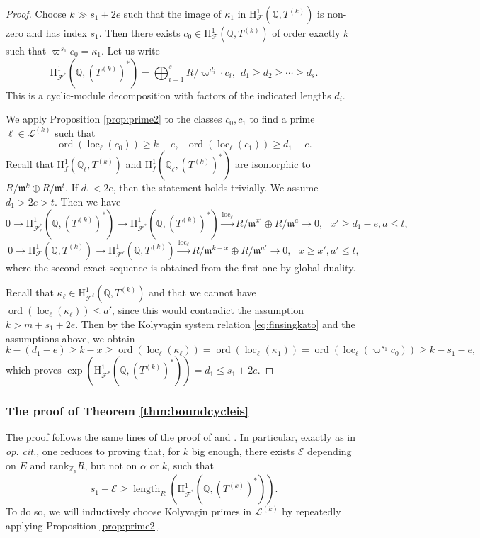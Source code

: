 \documentclass[10pt,reqno]{amsart}
\numberwithin{equation}{section}
\theoremstyle{plain}
\theoremstyle{definition}
\theoremstyle{definition}
\theoremstyle{plain}
\theoremstyle{plain}
\theoremstyle{plain}
\theoremstyle{plain}
\theoremstyle{plain}
\theoremstyle{plain}
\DeclareMathOperator{\ord}{ord}
\newcommand{\Q}{\mathbb{Q}}
\newcommand{\Zp}{\mathbb{Z}_{p}}
\DeclareMathOperator{\loc}{loc}
\DeclareMathOperator{\length}{length}
\newcommand{\Fcal}{\mathcal{F}}
\newcommand{\cL}{\mathcal{L}}
\newcommand{\fm}{\mathfrak{m}}
\newcommand{\rH}{\mathrm{H}}
\begin{document}
\begin{proof}
Choose $k\gg s_1+2e$ such that the image of $\kappa_1$ in $\rH^1_{\Fcal}(\Q,T^{(k)})$ is non-zero and has index $s_1$. Then there exists $c_0\in\rH^1_{\Fcal}(\Q,T^{(k)})$ of order exactly $k$ such that $\varpi^{s_1}c_0 = \kappa_1$. 
Let us write
\[
\rH^1_{\Fcal^*}(\Q,(T^{(k)})^*)=\bigoplus_{i=1}^{s} R/\varpi^{d_i}\cdot c_i, \ \ d_1\geq d_2 \geq \cdots \geq d_s.
\]
This is a cyclic-module decomposition with factors of the indicated lengths $d_i$. 

We apply Proposition \ref{prop:prime2} to the classes $c_0, c_1$ to find a prime $\ell \in \cL^{(k)}$ such that
\[
\ord(\loc_{\ell}(c_0))\geq k-e, \ \ \ \ord(\loc_{\ell}(c_1))\geq d_1-e.
\]
Recall that $\rH^1_f(\Q_{\ell},T^{(k)})$ and $\rH^1_f(\Q_{\ell}, (T^{(k)})^*)$ are isomorphic to $R/\fm^k\oplus R/\fm^t$. If $d_1<2e$, then the statement holds trivially. We assume $d_1>2e>t$. Then we have
\[
0\to \rH^1_{\Fcal^*_{\ell}}(\Q,(T^{(k)})^*) \to \rH^1_{\Fcal^*}(\Q,(T^{(k)})^*) \xrightarrow{\loc_\ell} R/\fm^{x'}\oplus R/\fm^a \to 0, \ \ \ x'\geq d_1-e, a\leq t,
\]
\[
0\to \rH^1_{\Fcal}(\Q,T^{(k)}) \to \rH^1_{\Fcal^{\ell}}(\Q,T^{(k)}) \xrightarrow{\loc_\ell} R/\fm^{k-x} \oplus R/\fm^{a'}\to 0, \ \ \ x\geq x', a'\leq t,
\]
where the second exact sequence is obtained from the first one by global duality. 

Recall that $\kappa_\ell \in \rH^1_{\Fcal^{\ell}}(\Q,T^{(k)})$ and that we cannot have $\ord(\loc_{\ell}(\kappa_\ell))\leq a'$, 
since this would contradict the assumption $k > m+s_1+2e$. Then by the Kolyvagin system relation \eqref{eq:finsingkato} and the assumptions above, we obtain
\[
k-(d_1 -e)\geq k-x\geq \ord(\loc_{\ell}(\kappa_\ell))=\ord(\loc_{\ell}(\kappa_1))=\ord(\loc_{\ell}(\varpi^{s_1}c_0))\geq k-s_1-e,
\]
which proves $\operatorname{exp}(\rH^1_{\Fcal^*}(\Q,(T^{(k)})^*))=d_1 \leq s_1+2e$. 
\end{proof}

\subsubsection{The proof of Theorem \ref{thm:boundcycleis}}
The proof follows the same lines of the proof of \cite[Thm. 3.2.1]{eisenstein} and \cite[Thm. 6.1.1]{eisenstein_cyc}. In particular, exactly as in \emph{op. cit.}, one reduces to proving that, for $k$ big enough, there exists $\mathcal{E}$  depending on $E$ and $\mathrm{rank}_{\Zp}R$, but not on $\alpha$ or $k$, such that
\begin{equation}\label{eq:bound}
\tag{B}
s_1+ \mathcal{E}\geq \length_R(\rH^1_{\Fcal^*}(\Q,(T^{(k)})^*)).
\end{equation}
To do so, we will inductively choose Kolyvagin primes in $\cL^{(k)}$ by repeatedly applying Proposition \ref{prop:prime2}. 
\end{document}
